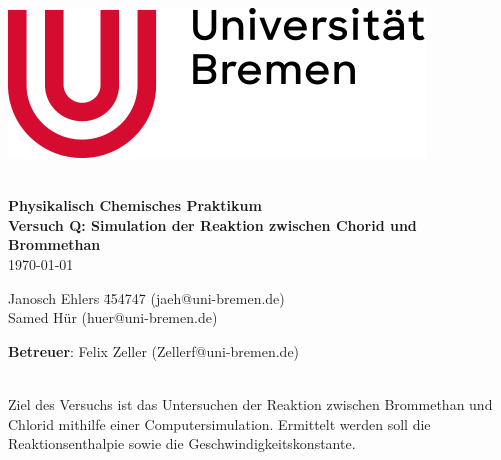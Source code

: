 \documentclass[a4paper, 11pt]{article}
\begin{document}
\begin{titlepage}
\begin{flushright}
\includegraphics[width=0.3\linewidth]{uni.png}
\end{flushright}

~\\[1cm]
{\bf \Huge
Physikalisch Chemisches Praktikum\\\large Versuch Q: Simulation der Reaktion zwischen Chorid und Brommethan
}\\[5mm]
\today

\vfill
\begin{tabbing}
Janosch Ehlers \hspace{3mm}\= 454747 (jaeh@uni-bremen.de)\\
Samed Hür  (huer@uni-bremen.de)\\
\end{tabbing}
\textbf{Betreuer}: Felix Zeller (Zellerf@uni-bremen.de)\\
~\\[3cm]

\clearpage
\thispagestyle{empty}
\end{titlepage}

\newpage
\tableofcontents
\thispagestyle{empty}
\clearpage
\newpage
{}


Ziel des Versuchs ist das Untersuchen der Reaktion zwischen Brommethan und Chlorid mithilfe einer Computersimulation. Ermittelt werden soll die Reaktionsenthalpie sowie die Geschwindigkeitskonstante.



\printbibliography
\end{document}
